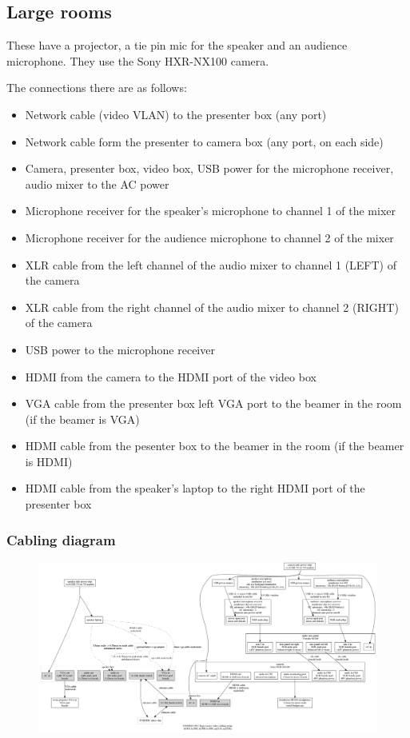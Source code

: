 \documentclass{article}
\begin{document}
\subsection{Large rooms}
These have a projector, a tie pin mic for the speaker and an audience microphone. They use the Sony HXR-NX100 camera. 

The connections there are as follows:

\begin{itemize}
  \item Network cable (video VLAN) to the presenter box (any port)
  \item Network cable form the presenter to camera box (any port, on each side)
  \item Camera, presenter box, video box, USB power for the microphone receiver, audio mixer to the AC power
  \item Microphone receiver for the speaker's microphone to channel 1 of the mixer
  \item Microphone receiver for the audience microphone to channel 2 of the mixer
  \item XLR cable from the left channel of the audio mixer to channel 1 (LEFT) of the camera
  \item XLR cable from the right channel of the audio mixer to channel 2 (RIGHT) of the camera
  \item USB power to the microphone receiver
  \item HDMI from the camera to the HDMI port of the video box
  \item VGA cable from the presenter box left VGA port to the beamer in the room (if the beamer is VGA)
  \item HDMI cable from the pesenter box to the beamer in the room (if the beamer is HDMI)
  \item HDMI cable from the speaker's laptop to the right HDMI port of the presenter box
\end{itemize}
\subsubsection{Cabling diagram}
\begin{figure}[H]
  \begin{sideways}
  \centering
  \includegraphics[width = 200mm]{../../graph/cabling_large_rooms.png}
  \end{sideways}
\end{figure}
\end{document}

